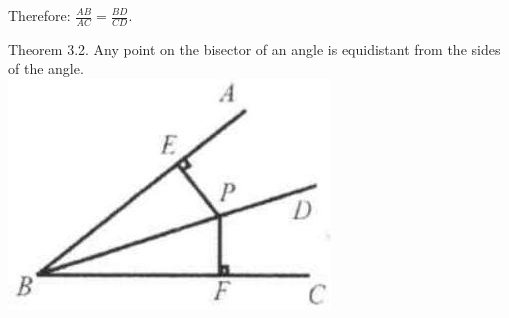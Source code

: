 \documentclass[10pt]{article}
\begin{document}
Therefore: \(\frac{A B}{A C}=\frac{B D}{C D}\).

Theorem 3.2. Any point on the bisector of an angle is equidistant from the sides of the angle.\\
\includegraphics[max width=\textwidth, center]{2025_04_17_97bc1f7e44d93c271a88g-053(2)}
\end{document}
